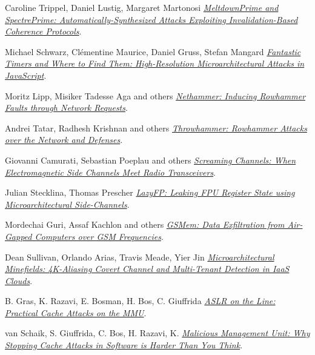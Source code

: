 \begin{frame}[allowframebreaks]
\begin{thebibliography}{10}
    Caroline Trippel, Daniel Lustig, Margaret Martonosi
    \newblock \href{https://arxiv.org/abs/1802.03802}{\em MeltdownPrime and SpectrePrime: Automatically-Synthesized Attacks Exploiting Invalidation-Based Coherence Protocols}.

    Michael Schwarz, Clémentine Maurice, Daniel Gruss, Stefan Mangard
    \newblock \href{https://gruss.cc/files/fantastictimers.pdf}{\em Fantastic Timers and Where to Find Them: High-Resolution Microarchitectural Attacks in JavaScript}.

    Moritz Lipp, Misiker Tadesse Aga and others
    \newblock \href{https://arxiv.org/abs/1805.04956}{\em Nethammer: Inducing Rowhammer Faults through Network Requests}.

    Andrei Tatar, Radhesh Krishnan and others
    \newblock \href{https://www.cs.vu.nl/~herbertb/download/papers/throwhammer_atc18.pdf}{\em Throwhammer: Rowhammer Attacks over the Network and Defenses}.

    Giovanni Camurati, Sebastian Poeplau and others
    \newblock \href{http://s3.eurecom.fr/tools/screaming_channels/}{\em Screaming Channels: When Electromagnetic Side Channels Meet Radio Transceivers}.

    Julian Stecklina, Thomas Prescher
    \newblock \href{https://blog.cyberus-technology.de/images/lazyFP.pdf}{\em LazyFP: Leaking FPU Register State using Microarchitectural Side-Channels}.

    Mordechai Guri, Assaf Kachlon and others
    \newblock \href{https://www.usenix.org/conference/usenixsecurity15/technical-sessions/presentation/guri}{\em GSMem: Data Exfiltration from Air-Gapped Computers over GSM Frequencies}.

    Dean Sullivan, Orlando Arias, Travis Meade, Yier Jin
    \newblock \href{http://wp.internetsociety.org/ndss/wp-content/uploads/sites/25/2018/03/NDSS2018-06A-3_Sullivan_Slides.pdf}{\em Microarchitectural Minefields: 4K-Aliasing Covert Channel and Multi-Tenant Detection in IaaS Clouds}.

    B. Gras, K. Razavi, E. Bosman, H. Bos, C. Giuffrida
    \newblock \href{https://www.vusec.net/download/?t=papers/anc_ndss17.pdf}{\em ASLR on the Line: Practical Cache Attacks on the MMU}.

    van Schaik, S. Giuffrida, C. Bos, H. Razavi, K.
    \newblock \href{https://bibbase.org/network/publication/vanschaik-giuffrida-bos-razavi-maliciousmanagementunitwhystoppingcacheattacksinsoftwareisharderthanyouthink-2018}{\em Malicious Management Unit: Why Stopping Cache Attacks in Software is Harder Than You Think}.


\end{thebibliography}
\end{frame}
